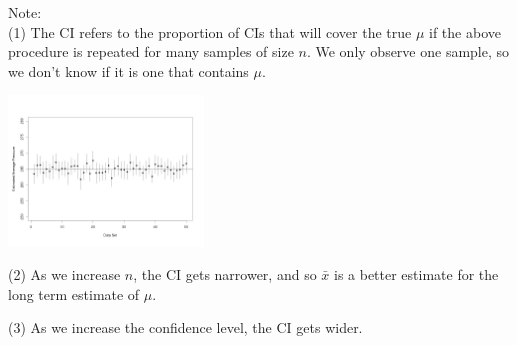 \documentclass[t,xcolor=pdftex,dvipsnames,table]{beamer}\usepackage[]{graphicx}\usepackage[]{color}
\begin{document}
\begin{frame}[fragile]{}

\vspace{.5cm}
Note: \\
(1) The CI refers to the proportion of CIs that will cover the true $\mu$ if the above procedure is repeated for many samples of size $n$. We only observe one sample, so we don't know if it is one that contains $\mu$. 

\includegraphics[height=4cm]{../images/CI.jpg} 

\vspace{.5cm}
(2) As we increase $n$, the CI gets narrower, and so $\bar{x}$ is a better estimate for the long term estimate of $\mu$.
\end{frame}

\begin{frame}[fragile]{}

\vspace{.5cm}
(3) As we increase the confidence level, the CI gets wider.
\end{frame}
\end{document}
